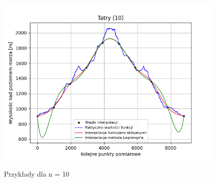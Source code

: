 \documentclass[fleqn]{article}
\begin{document}
\begin{figure}[h]
\begin{minipage}{.33\textwidth}
          \label{fig:sub2}
        \end{minipage}%
        \begin{minipage}{.33\textwidth}
          \centering
          \includegraphics[width=\linewidth]{plot_10_points_Tatry.png}
          \label{fig:sub3}
        \end{minipage}
        \caption{Przykłady dla n = 10}
        \label{fig:test}
    \end{figure}
\end{document}
